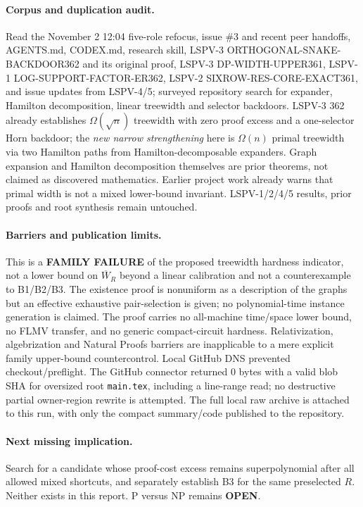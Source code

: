 \documentclass[11pt]{article}
\begin{document}
\paragraph{Corpus and duplication audit.}
Read the November 2 12:04 five-role refocus, issue \#3 and recent peer handoffs, AGENTS.md, CODEX.md, research skill, LSPV-3 ORTHOGONAL-SNAKE-BACKDOOR362 and its original proof, LSPV-3 DP-WIDTH-UPPER361, LSPV-1 LOG-SUPPORT-FACTOR-ER362, LSPV-2 SIXROW-RES-CORE-EXACT361, and issue updates from LSPV-4/5; surveyed repository search for expander, Hamilton decomposition, linear treewidth and selector backdoors. LSPV-3 362 already establishes $\Omega(\sqrt n)$ treewidth with zero proof excess and a one-selector Horn backdoor; the \emph{new narrow strengthening} here is $\Omega(n)$ primal treewidth via two Hamilton paths from Hamilton-decomposable expanders. Graph expansion and Hamilton decomposition themselves are prior theorems, not claimed as discovered mathematics. Earlier project work already warns that primal width is not a mixed lower-bound invariant. LSPV-1/2/4/5 results, prior proofs and root synthesis remain untouched.

\paragraph{Barriers and publication limits.}
This is a \textbf{FAMILY FAILURE} of the proposed treewidth hardness indicator, not a lower bound on $\overline W_R$ beyond a linear calibration and not a counterexample to B1/B2/B3. The existence proof is nonuniform as a description of the graphs but an effective exhaustive pair-selection is given; no polynomial-time instance generation is claimed. The proof carries no all-machine time/space lower bound, no FLMV transfer, and no generic compact-circuit hardness. Relativization, algebrization and Natural Proofs barriers are inapplicable to a mere explicit family upper-bound countercontrol. Local GitHub DNS prevented checkout/preflight. The GitHub connector returned 0 bytes with a valid blob SHA for oversized root \texttt{main.tex}, including a line-range read; no destructive partial owner-region rewrite is attempted. The full local raw archive is attached to this run, with only the compact summary/code published to the repository.
\paragraph{Next missing implication.}
Search for a candidate whose proof-cost excess remains superpolynomial after all allowed mixed shortcuts, and separately establish B3 for the same preselected $R$. Neither exists in this report. P versus NP remains \textbf{OPEN}.
\end{document}
